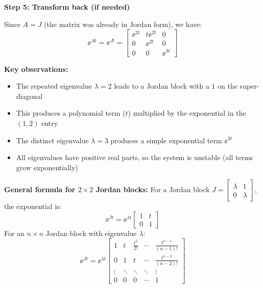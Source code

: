 \documentclass[11pt,a4paper]{article}
\begin{document}
\textbf{Step 5: Transform back (if needed)}

Since $A = J$ (the matrix was already in Jordan form), we have:
\begin{equation}
	\ee^{At} = \ee^{Jt} = \begin{bmatrix} \ee^{2t} & t\ee^{2t} & 0 \\ 0 & \ee^{2t} & 0 \\ 0 & 0 & \ee^{3t} \end{bmatrix}
\end{equation}

\textbf{Key observations:}
\begin{itemize}
\item The repeated eigenvalue $\lambda = 2$ leads to a Jordan block with a $1$ on the super-diagonal
\item This produces a polynomial term ($t$) multiplied by the exponential in the $(1,2)$ entry
\item The distinct eigenvalue $\lambda = 3$ produces a simple exponential term $\ee^{3t}$
\item All eigenvalues have positive real parts, so the system is unstable (all terms grow exponentially)
\end{itemize}

\textbf{General formula for $2\times 2$ Jordan blocks:}
For a Jordan block $J = \begin{bmatrix} \lambda & 1 \\ 0 & \lambda \end{bmatrix}$, the exponential is:
\begin{equation}
	\ee^{Jt} = \ee^{\lambda t}\begin{bmatrix} 1 & t \\ 0 & 1 \end{bmatrix}
\end{equation}
For an $n \times n$ Jordan block with eigenvalue $\lambda$:
\begin{equation}
	\ee^{Jt} = \ee^{\lambda t}\begin{bmatrix} 1 & t & \frac{t^2}{2!} & \cdots & \frac{t^{n-1}}{(n-1)!} \\ 0 & 1 & t & \cdots & \frac{t^{n-2}}{(n-2)!} \\ \vdots & \ddots & \ddots & \ddots & \vdots \\ 0 & 0 & 0 & \cdots & 1 \end{bmatrix}
\end{equation}
\end{document}
